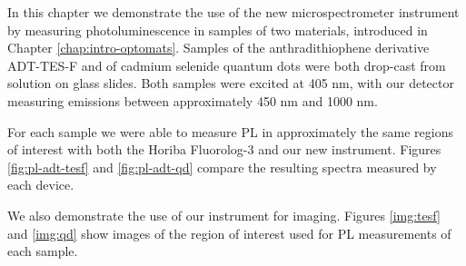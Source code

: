 
In this chapter we demonstrate the use of the new microspectrometer instrument by measuring photoluminescence in samples of two materials, introduced in Chapter \ref{chap:intro-optomats}. Samples of the anthradithiophene derivative ADT-TES-F and of cadmium selenide quantum dots were both drop-cast from solution on glass slides. Both samples were excited at 405 nm, with our detector measuring emissions between approximately 450 nm and 1000 nm.

For each sample we were able to measure PL in approximately the same regions of interest with both the Horiba Fluorolog-3 and our new instrument. Figures \ref{fig:pl-adt-tesf} and \ref{fig:pl-adt-qd} compare the resulting spectra measured by each device. 

We also demonstrate the use of our instrument for imaging. Figures \ref{img:tesf} and \ref{img:qd} show images of the region of interest used for PL measurements of each sample. 

